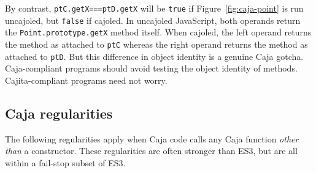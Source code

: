 \documentclass[letterpaper,twocolumn,10pt]{article}
\newcommand{\code}[1]{{\tt {#1}}}              %
\begin{document}
\begin{description}
  By contrast, \code{ptC.getX===ptD.getX} will be \code{true} if 
  Figure~\ref{fig:caja-point} is run uncajoled, but \code{false} if cajoled. 
  In uncajoled JavaScript, both operands return the 
  \code{Point.prototype.getX} method itself. When cajoled, the left operand 
  returns the method as attached to \code{ptC} whereas the right operand 
  returns the method as attached to \code{ptD}. But this difference in 
  object identity is a genuine Caja gotcha. Caja-compliant programs should 
  avoid testing the object identity of methods. Cajita-compliant programs 
  need not worry.

\end{description}

\subsection{Caja regularities}

The following regularities apply when Caja code calls any Caja function 
\emph{other than} a constructor. These regularities are often stronger than 
ES3, but are all within a fail-stop subset of ES3. 
\end{document}
